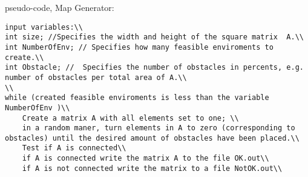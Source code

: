 pseudo-code, Map Generator:\\
\begin{verbatim}
input variables:\\
int size; //Specifies the width and height of the square matrix  A.\\
int NumberOfEnv; // Specifies how many feasible enviroments to create.\\
int Obstacle; //  Specifies the number of obstacles in percents, e.g. number of obstacles per total area of A.\\
\\
while (created feasible enviroments is less than the variable NumberOfEnv )\\
	Create a matrix A with all elements set to one; \\
	in a random maner, turn elements in A to zero (corresponding to obstacles) until the desired amount of obstacles have been placed.\\
	Test if A is connected\\
	if A is connected write the matrix A to the file OK.out\\
	if A is not connected write the matrix to a file NotOK.out\\
\end{verbatim}

